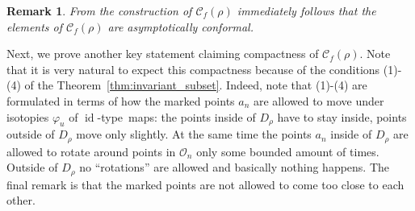 \documentclass[10pt,reqno,a4paper]{amsart}
\numberwithin{figure}{section}
\numberwithin{equation}{section}
\newtheorem{remark}[thm]{Remark}
\newcommand{\idt}{of $\id$-type}
\newcommand{\id}{\operatorname{id}}
\begin{document}
\begin{remark}
	From the construction of $\mathcal{C}_f(\rho)$ immediately follows that the elements of $\mathcal{C}_f(\rho)$ are asymptotically conformal.	
\end{remark}

Next, we prove another key statement claiming compactness of $\mathcal{C}_f(\rho)$. Note that it is very natural to expect this compactness because of the conditions (1)-(4) of the Theorem~\ref{thm:invariant_subset}. Indeed, note that (1)-(4) are formulated in terms of how the marked points $a_n$ are allowed to move under isotopies $\varphi_u$ \idt\ maps: the points inside of $D_\rho$ have to stay inside, points outside of $D_\rho$ move only slightly. At the same time the points $a_n$ inside of $D_\rho$ are allowed to rotate around points in $\mathcal{O}_n$ only some bounded amount of times. Outside of $D_\rho$ no ``rotations'' are allowed and basically nothing happens. The final remark is that the marked points are not allowed to come too close to each other.
\end{document}

